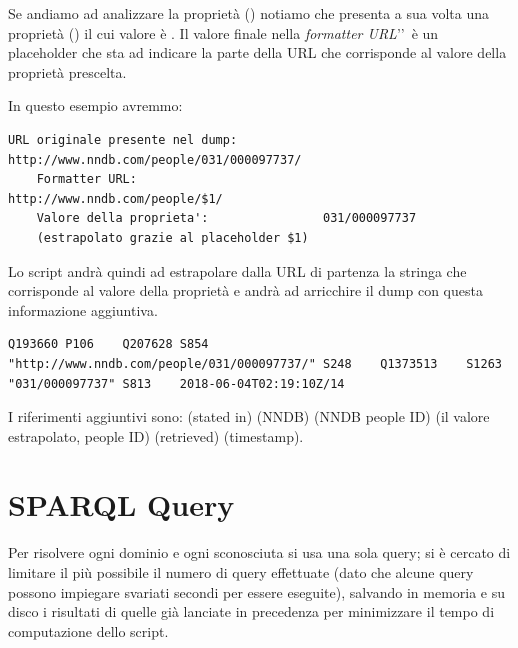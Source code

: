 Se andiamo ad analizzare la proprietà  (\cite{P1263}) notiamo che presenta a sua volta una proprietà 
 (\cite{P1630}) il cui valore è . 
Il valore finale  nella \textit{formatter URL}\rq\rq\ è un placeholder che sta ad indicare la parte della URL che corrisponde al valore della proprietà prescelta. 

In questo esempio avremmo:
\begin{lstlisting}[style=QuickstatementsStyle, caption=Esempio di formatter URL]
    URL originale presente nel dump:        http://www.nndb.com/people/031/000097737/
    Formatter URL:                          http://www.nndb.com/people/$1/
    Valore della proprieta':                031/000097737
    (estrapolato grazie al placeholder $1)
\end{lstlisting}

Lo script andrà quindi ad estrapolare dalla URL di partenza la stringa  che corrisponde al valore della proprietà  e andrà ad arricchire il dump 
con questa informazione aggiuntiva.

\begin{lstlisting}[style=QuickstatementsStyle, caption=Risultato dello script]
    Q193660	P106	Q207628	S854	"http://www.nndb.com/people/031/000097737/"	S248	Q1373513	S1263	"031/000097737"	S813	2018-06-04T02:19:10Z/14
\end{lstlisting}

I riferimenti aggiuntivi sono: 
 (stated in\cite{P248})
 (NNDB\cite{Q1373513})
 (NNDB people ID\cite{P1263})
 (il valore estrapolato, people ID)
 (retrieved\cite{P813})
 (timestamp).

\section{SPARQL Query}
Per risolvere ogni dominio e ogni  sconosciuta si usa una sola query; si è cercato di limitare il più possibile il numero di query effettuate 
(dato che alcune query possono impiegare svariati secondi per essere eseguite), 
salvando in memoria e su disco i risultati di quelle già lanciate in precedenza per minimizzare il tempo di computazione dello script.

